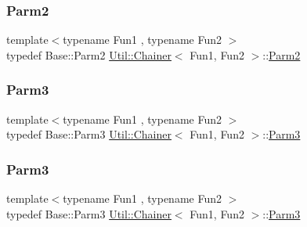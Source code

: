 \mbox{\label{classUtil_1_1Chainer_a1bfb0e8f35679278c85d232a74a107ff}} 
\subsubsection{\texorpdfstring{Parm2}{Parm2}\hspace{0.1cm}{\footnotesize\ttfamily [2/2]}}
{\footnotesize\ttfamily template$<$typename Fun1 , typename Fun2 $>$ \\
typedef Base\+::\+Parm2 \mbox{\hyperlink{classUtil_1_1Chainer}{Util\+::\+Chainer}}$<$ Fun1, Fun2 $>$\+::\mbox{\hyperlink{classUtil_1_1Chainer_a1bfb0e8f35679278c85d232a74a107ff}{Parm2}}}

\mbox{\label{classUtil_1_1Chainer_ac28811d7153f7b7cf837f7b8626436c8}} 
\subsubsection{\texorpdfstring{Parm3}{Parm3}\hspace{0.1cm}{\footnotesize\ttfamily [1/2]}}
{\footnotesize\ttfamily template$<$typename Fun1 , typename Fun2 $>$ \\
typedef Base\+::\+Parm3 \mbox{\hyperlink{classUtil_1_1Chainer}{Util\+::\+Chainer}}$<$ Fun1, Fun2 $>$\+::\mbox{\hyperlink{classUtil_1_1Chainer_ac28811d7153f7b7cf837f7b8626436c8}{Parm3}}}

\mbox{\label{classUtil_1_1Chainer_ac28811d7153f7b7cf837f7b8626436c8}} 
\subsubsection{\texorpdfstring{Parm3}{Parm3}\hspace{0.1cm}{\footnotesize\ttfamily [2/2]}}
{\footnotesize\ttfamily template$<$typename Fun1 , typename Fun2 $>$ \\
typedef Base\+::\+Parm3 \mbox{\hyperlink{classUtil_1_1Chainer}{Util\+::\+Chainer}}$<$ Fun1, Fun2 $>$\+::\mbox{\hyperlink{classUtil_1_1Chainer_ac28811d7153f7b7cf837f7b8626436c8}{Parm3}}}

